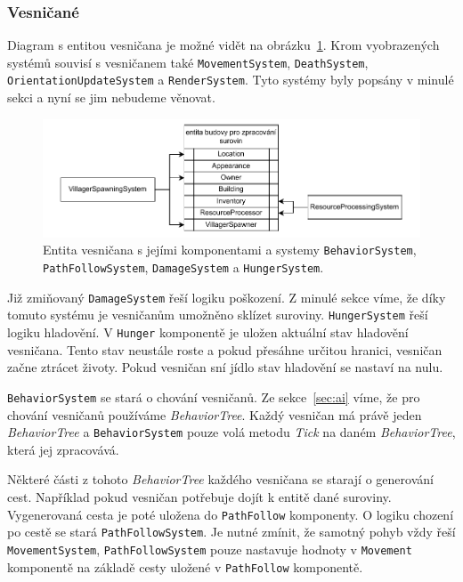 \subsubsection{Vesničané}
Diagram s entitou vesničana je možné vidět na obrázku~\ref{fig:villager}. Krom vyobrazených systémů souvisí s vesničanem také \texttt{MovementSystem}, \texttt{DeathSystem}, \texttt{OrientationUpdateSystem} a \texttt{RenderSystem}. Tyto systémy byly popsány v minulé sekci a nyní se jim nebudeme věnovat.

\begin{figure}[!htb]
  \centering
  \includegraphics[width=1.0\linewidth]{img/villager.pdf}
  \caption{Entita vesničana s jejími komponentami a systemy \texttt{BehaviorSystem}, \texttt{PathFollowSystem}, \texttt{DamageSystem} a \texttt{HungerSystem}.}
  \label{fig:villager}
\end{figure}

Již zmiňovaný \texttt{DamageSystem} řeší logiku poškození. Z minulé sekce víme, že díky tomuto systému je vesničanům umožněno sklízet suroviny. \texttt{HungerSystem} řeší logiku hladovění. V \texttt{Hunger} komponentě je uložen aktuální stav hladovění vesničana. Tento stav neustále roste a pokud přesáhne určitou hranici, vesničan začne ztrácet životy. Pokud vesničan sní jídlo stav hladovění se nastaví na nulu.

\texttt{BehaviorSystem} se stará o chování vesničanů. Ze sekce~\ref{sec:ai} víme, že pro chování vesničanů používáme \textit{BehaviorTree}. Každý vesničan má právě jeden \textit{BehaviorTree} a \texttt{BehaviorSystem} pouze volá metodu \textit{Tick} na daném \textit{BehaviorTree}, která jej zpracovává.

Některé části z tohoto \textit{BehaviorTree} každého vesničana se starají o generování cest. Například pokud vesničan potřebuje dojít k entitě dané suroviny. Vygenerovaná cesta je poté uložena do \texttt{PathFollow} komponenty. O logiku chození po cestě se stará \texttt{PathFollowSystem}. Je nutné zmínit, že samotný pohyb vždy řeší \texttt{MovementSystem}, \texttt{PathFollowSystem} pouze nastavuje hodnoty v \texttt{Movement} komponentě na základě cesty uložené v \texttt{PathFollow} komponentě.

